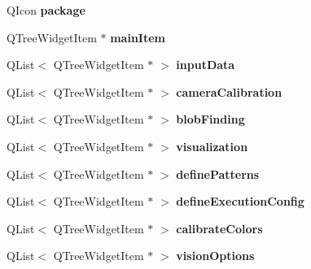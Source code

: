 \begin{DoxyCompactItemize}
\item 
Q\+Icon {\bfseries package}\hypertarget{classMainWindow_a211b3162d03a5c229ac006150286429e}{}\label{classMainWindow_a211b3162d03a5c229ac006150286429e}

\item 
Q\+Tree\+Widget\+Item $\ast$ {\bfseries main\+Item}\hypertarget{classMainWindow_a4a0290f0cbe44f14933b0903728d420c}{}\label{classMainWindow_a4a0290f0cbe44f14933b0903728d420c}

\item 
Q\+List$<$ Q\+Tree\+Widget\+Item $\ast$ $>$ {\bfseries input\+Data}\hypertarget{classMainWindow_ab00172798ad65e4b60d1e14bc681a50d}{}\label{classMainWindow_ab00172798ad65e4b60d1e14bc681a50d}

\item 
Q\+List$<$ Q\+Tree\+Widget\+Item $\ast$ $>$ {\bfseries camera\+Calibration}\hypertarget{classMainWindow_ae9035f46a000100ab63f1120ca24fe6c}{}\label{classMainWindow_ae9035f46a000100ab63f1120ca24fe6c}

\item 
Q\+List$<$ Q\+Tree\+Widget\+Item $\ast$ $>$ {\bfseries blob\+Finding}\hypertarget{classMainWindow_a775aad7d368aa4c677f29dfca49a0ad3}{}\label{classMainWindow_a775aad7d368aa4c677f29dfca49a0ad3}

\item 
Q\+List$<$ Q\+Tree\+Widget\+Item $\ast$ $>$ {\bfseries visualization}\hypertarget{classMainWindow_aa9dda32a86d3b8aa580702e4ff2b38b9}{}\label{classMainWindow_aa9dda32a86d3b8aa580702e4ff2b38b9}

\item 
Q\+List$<$ Q\+Tree\+Widget\+Item $\ast$ $>$ {\bfseries define\+Patterns}\hypertarget{classMainWindow_ad3cbf1c79dc9d0902d62c8a93cdb2858}{}\label{classMainWindow_ad3cbf1c79dc9d0902d62c8a93cdb2858}

\item 
Q\+List$<$ Q\+Tree\+Widget\+Item $\ast$ $>$ {\bfseries define\+Execution\+Config}\hypertarget{classMainWindow_a686866bc623187ded39b2437a8201a7c}{}\label{classMainWindow_a686866bc623187ded39b2437a8201a7c}

\item 
Q\+List$<$ Q\+Tree\+Widget\+Item $\ast$ $>$ {\bfseries calibrate\+Colors}\hypertarget{classMainWindow_af628c14836088c853d902d7691161ed4}{}\label{classMainWindow_af628c14836088c853d902d7691161ed4}

\item 
Q\+List$<$ Q\+Tree\+Widget\+Item $\ast$ $>$ {\bfseries vision\+Options}\hypertarget{classMainWindow_a900f4c07ecd31f033fc927ec8d3f4095}{}\label{classMainWindow_a900f4c07ecd31f033fc927ec8d3f4095}


\end{DoxyCompactItemize}
